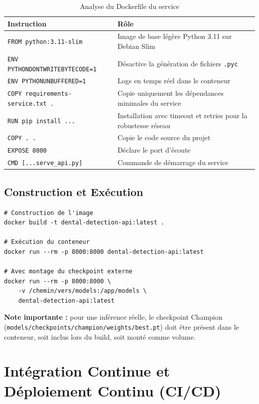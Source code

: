 \documentclass{rapportENSIAS}
\newcommand{\projectpath}[1]{\texttt{#1}}
\begin{document}
\begin{table}[H]
\centering
\caption{Analyse du Dockerfile du service}
\label{tab:dockerfile}
\begin{tabular}{p{4cm} p{10cm}}
\toprule
\textbf{Instruction} & \textbf{Rôle} \\
\midrule
\texttt{FROM python:3.11-slim}
  & Image de base légère Python 3.11 sur Debian Slim \\
\texttt{ENV PYTHONDONTWRITEBYTECODE=1}
  & Désactive la génération de fichiers \texttt{.pyc} \\
\texttt{ENV PYTHONUNBUFFERED=1}
  & Logs en temps réel dans le conteneur \\
\texttt{COPY requirements-service.txt .}
  & Copie uniquement les dépendances minimales du service \\
\texttt{RUN pip install ...}
  & Installation avec timeout et retries pour la robustesse réseau \\
\texttt{COPY . .}
  & Copie le code source du projet \\
\texttt{EXPOSE 8000}
  & Déclare le port d'écoute \\
\texttt{CMD [...serve\_api.py]}
  & Commande de démarrage du service \\
\bottomrule
\end{tabular}
\end{table}

\subsection{Construction et Exécution}

\begin{verbatim}
# Construction de l'image
docker build -t dental-detection-api:latest .

# Exécution du conteneur
docker run --rm -p 8000:8000 dental-detection-api:latest

# Avec montage du checkpoint externe
docker run --rm -p 8000:8000 \
    -v /chemin/vers/models:/app/models \
    dental-detection-api:latest
\end{verbatim}

\textbf{Note importante :} pour une inférence réelle, le checkpoint Champion
(\projectpath{models/checkpoints/champion/weights/best.pt}) doit être présent
dans le conteneur, soit inclus lors du build, soit monté comme volume.

\section{Intégration Continue et Déploiement Continu (CI/CD)}
\end{document}
